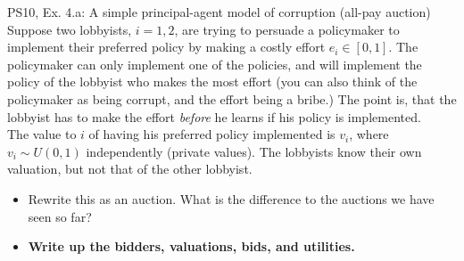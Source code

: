 \begin{frame}{PS10, Ex. 4.a: A simple principal-agent model of corruption (all-pay auction)}
    Suppose two lobbyists, $i = 1, 2$, are trying to persuade a policymaker to implement their preferred policy by making a costly effort $e_i\in[0, 1]$. The policymaker can only implement one of the policies, and will implement the policy of the lobbyist who makes the most effort (you can also think of the policymaker as being corrupt, and the effort being a bribe.) The point is, that the lobbyist has to make the effort \textit{before} he learns if his policy is implemented.\\\medskip
    The value to $i$ of having his preferred policy implemented is $v_i$, where $v_i\sim U(0, 1)$ independently (private values). The lobbyists know their own valuation, but not that of the other lobbyist.
    \begin{itemize}
      \item[(a)] Rewrite this as an auction. What is the difference to the auctions we have seen so far?
    \end{itemize}
    \vspace{-8pt}
    \begin{multicols}{2}
      \begin{itemize}
        \item[Step 1:] \textbf{Write up the bidders, valuations, bids, and utilities.}
      \end{itemize}
      \vfill\null\columnbreak
      \vfill\null
    \end{multicols}
\end{frame}
